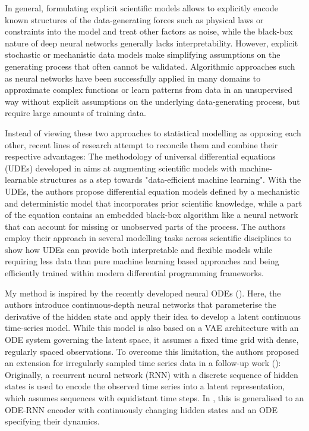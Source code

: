 In general, formulating explicit scientific models allows to explicitly encode known structures of the data-generating forces such as physical laws or constraints into the model and treat other factors as noise, while the black-box nature of deep neural networks generally lacks interpretability. However, explicit stochastic or mechanistic data models make simplifying assumptions on the generating process that often cannot be validated. Algorithmic approaches such as neural networks have been successfully applied in many domains to approximate complex functions or learn patterns from data in an unsupervised way without explicit assumptions on the underlying data-generating process, but require large amounts of training data. 

Instead of viewing these two approaches to statistical modelling as opposing each other, recent lines of research attempt to reconcile them and combine their respective advantages: 
The methodology of universal differential equations (UDEs) developed in \cite{Rackauckas2020} aims at augmenting scientific models with machine-learnable structures as a step towards "data-efficient machine learning". With the UDEs, the authors propose differential equation models defined by a mechanistic and deterministic model that incorporates prior scientific knowledge, while a part of the equation contains an embedded black-box algorithm like a neural network that can account for missing or unobserved parts of the process. The authors employ their approach in several modelling tasks across scientific disciplines to show how UDEs can provide both interpretable and flexible models while requiring less data than pure machine learning based approaches and being efficiently trained within modern differential programming frameworks.  

My method is inspired by the recently developed neural ODEs (\cite{Chen2018}). Here, the authors introduce continuous-depth neural networks that parameterise the derivative of the hidden state and apply their idea to develop a latent continuous time-series model. While this model is also based on a VAE architecture with an ODE system governing the latent space, it assumes a fixed time grid with dense, regularly spaced observations. 
To overcome this limitation, the authors proposed an extension for irregularly sampled time series data in a follow-up work (\cite{Rubanova2019}): Originally, a recurrent neural network (RNN) with a discrete sequence of hidden states is used to encode the observed time series into a latent representation, which assumes sequences with equidistant time steps. In \cite{Rubanova2019}, this is generalised to an ODE-RNN encoder with continuously changing hidden states and an ODE specifying their dynamics. 

